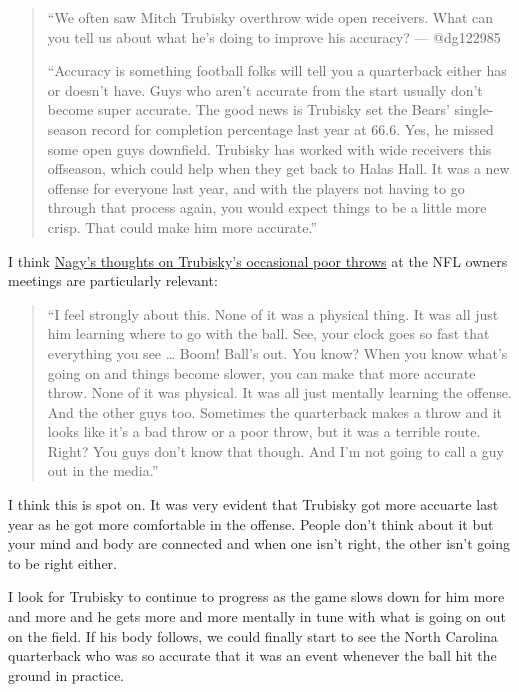 \documentclass[11pt]{article}
\begin{document}
\begin{itemize}
  \begin{quote}
    ``We often saw Mitch Trubisky overthrow wide open receivers. What can you tell us about what he’s doing to improve his accuracy? — @dg122985

``Accuracy is something football folks will tell you a quarterback either has or doesn’t have. Guys who aren’t accurate from the start usually don’t become super accurate. The good news is Trubisky set the Bears’ single-season record for completion percentage last year at 66.6. Yes, he missed some open guys downfield. Trubisky has worked with wide receivers this offseason, which could help when they get back to Halas Hall. It was a new offense for everyone last year, and with the players not having to go through that process again, you would expect things to be a little more crisp. That could make him more accurate.''
\end{quote}

I think \href{https://www.chicagotribune.com/sports/football/bears/ct-spt-bears-matt-nagy-ryan-pace-nfl-owners-meetings-20190326-story.html}{Nagy's thoughts on Trubisky's occasional poor throws} at the NFL owners meetings are particularly relevant:

\begin{quote}
  ``I feel strongly about this. None of it was a physical thing. It was all just him learning where to go with the ball. See, your clock goes so fast that everything you see … Boom! Ball’s out. You know? When you know what’s going on and things become slower, you can make that more accurate throw. None of it was physical. It was all just mentally learning the offense. And the other guys too. Sometimes the quarterback makes a throw and it looks like it’s a bad throw or a poor throw, but it was a terrible route. Right? You guys don’t know that though. And I’m not going to call a guy out in the media.''
\end{quote}

I think this is spot on.  It was very evident that Trubisky got more accuarte last year as he got more comfortable in the offense.  People don't think about it but your mind and body are connected and when one isn't right, the other isn't going to be right either.

I look for Trubisky to continue to progress as the game slows down for him more and more and he gets more and more mentally in tune with what is going on out on the field.  If his body follows, we could finally start to see the North Carolina quarterback who was so accurate that it was an event whenever the ball hit the ground in practice.

\end{itemize}
\end{document}
